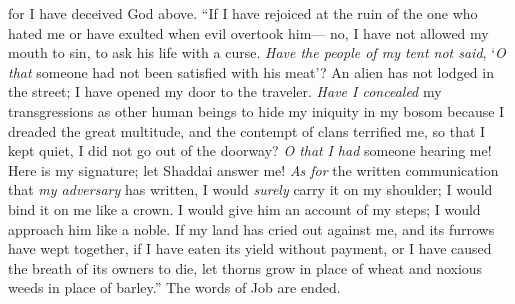 \begin{biblechapter}
for I have deceived God above.
\verse “If I have rejoiced at the ruin of the one who hated me 
or have exulted when evil overtook him—
\verse no, I have not allowed my mouth to sin, 
to ask his life with a curse.
\verse \textit{Have the people of my tent not said}, 
‘\textit{O that} someone had not been satisfied with his meat’?
\verse An alien has not lodged in the street; 
I have opened my door to the traveler.
\verse \textit{Have I concealed} my transgressions as other human beings 
to hide my iniquity in my bosom
\verse because I dreaded the great multitude, 
and the contempt of clans terrified me, 
so that I kept quiet, I did not go out of the doorway?
\verse \textit{O that} \textit{I had} someone hearing me! 
Here is my signature; 
let Shaddai answer me! 
\textit{As for} the written communication that \textit{my adversary} has written,
\verse I would \textit{surely} carry it on my shoulder; 
I would bind it on me like a crown.
\verse I would give him an account of my steps; 
I would approach him like a noble.
\verse If my land has cried out against me, 
and its furrows have wept together,
\verse if I have eaten its yield without payment, 
or I have caused the breath of its owners to die,
\verse let thorns grow in place of wheat 
and noxious weeds in place of barley.” 
The words of Job are ended.
\end{biblechapter}

